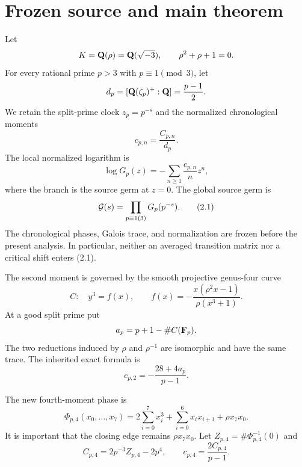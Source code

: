 \section{Frozen source and main theorem}\label{sec:source}

Let
\[
 K=\mathbf Q(\rho)=\mathbf Q(\sqrt{-3}),\qquad \rho^2+\rho+1=0.
\]
For every rational prime \(p>3\) with \(p\equiv1\pmod3\), let
\[
 d_p=[\mathbf Q(\zeta_p)^+:\mathbf Q]=\frac{p-1}{2}.
\]
We retain the split-prime clock \(z_p=p^{-s}\) and the normalized
chronological moments
\[
 c_{p,n}=\frac{C_{p,n}}{d_p}.
\]
The local normalized logarithm is
\[
 \log G_p(z)=-\sum_{n\ge1}\frac{c_{p,n}}{n}z^n,
\]
where the branch is the source germ at \(z=0\).  The global source germ is
\[
 \mathcal G(s)=\prod_{p\equiv1(3)}G_p(p^{-s}).                 \tag{2.1}
\]
The chronological phases, Galois trace, and normalization are frozen before
the present analysis.  In particular, neither an averaged transition matrix
nor a critical shift enters (2.1).

The second moment is governed by the smooth projective genus-four curve
\[
 C:\quad y^3=f(x),\qquad
 f(x)=-\frac{x(\rho^2x-1)}{\rho(x^3+1)}.                \tag{2.2}
\]
At a good split prime put
\[
 a_p=p+1-\#C(\mathbf F_p).
\]
The two reductions induced by \(\rho\) and \(\rho^{-1}\) are isomorphic and
have the same trace.  The inherited exact formula is
\[
 c_{p,2}=-\frac{28+4a_p}{p-1}.                         \tag{2.3}
\]

The new fourth-moment phase is
\[
 \Phi_{p,4}(x_0,\ldots,x_7)
 =2\sum_{i=0}^7x_i^3+\sum_{i=0}^6x_ix_{i+1}
   +\rho x_7x_0.                                       \tag{2.4}
\]
It is important that the closing edge remains \(\rho x_7x_0\).
Let \(Z_{p,4}=\#\Phi_{p,4}^{-1}(0)\) and
\[
 C_{p,4}=2p^{-3}Z_{p,4}-2p^4,\qquad
 c_{p,4}=\frac{2C_{p,4}}{p-1}.                         \tag{2.5}
\]

